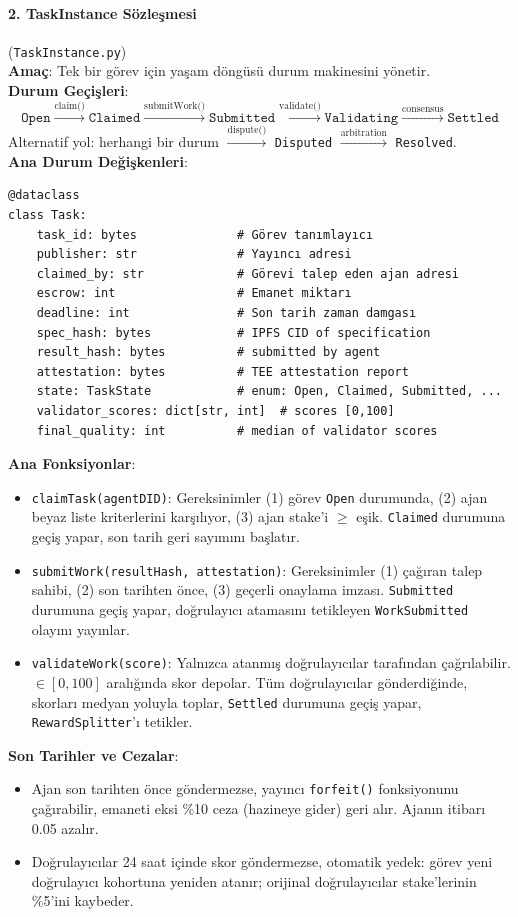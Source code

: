 \documentclass[11pt]{article}
\begin{document}
\paragraph{2. TaskInstance Sözleşmesi} (\texttt{TaskInstance.py})\\
\textbf{Amaç}: Tek bir görev için yaşam döngüsü durum makinesini yönetir.\\
\textbf{Durum Geçişleri}:
\begin{equation}
\texttt{Open} \xrightarrow{\text{claim()}} \texttt{Claimed} \xrightarrow{\text{submitWork()}} \texttt{Submitted} \xrightarrow{\text{validate()}} \texttt{Validating} \xrightarrow{\text{consensus}} \texttt{Settled}
\end{equation}
Alternatif yol: herhangi bir durum $\xrightarrow{\text{dispute()}}$ \texttt{Disputed} $\xrightarrow{\text{arbitration}}$ \texttt{Resolved}.\\
\textbf{Ana Durum Değişkenleri}:
\begin{verbatim}
@dataclass
class Task:
    task_id: bytes              # Görev tanımlayıcı
    publisher: str              # Yayıncı adresi
    claimed_by: str             # Görevi talep eden ajan adresi
    escrow: int                 # Emanet miktarı
    deadline: int               # Son tarih zaman damgası
    spec_hash: bytes            # IPFS CID of specification
    result_hash: bytes          # submitted by agent
    attestation: bytes          # TEE attestation report
    state: TaskState            # enum: Open, Claimed, Submitted, ...
    validator_scores: dict[str, int]  # scores [0,100]
    final_quality: int          # median of validator scores
\end{verbatim}
\textbf{Ana Fonksiyonlar}:
\begin{itemize}[noitemsep]
  \item \texttt{claimTask(agentDID)}: Gereksinimler (1) görev \texttt{Open} durumunda, (2) ajan beyaz liste kriterlerini karşılıyor, (3) ajan stake'i $\geq$ eşik. \texttt{Claimed} durumuna geçiş yapar, son tarih geri sayımını başlatır.
  \item \texttt{submitWork(resultHash, attestation)}: Gereksinimler (1) çağıran talep sahibi, (2) son tarihten önce, (3) geçerli onaylama imzası. \texttt{Submitted} durumuna geçiş yapar, doğrulayıcı atamasını tetikleyen \texttt{WorkSubmitted} olayını yayınlar.
  \item \texttt{validateWork(score)}: Yalnızca atanmış doğrulayıcılar tarafından çağrılabilir. $\in [0,100]$ aralığında skor depolar. Tüm doğrulayıcılar gönderdiğinde, skorları medyan yoluyla toplar, \texttt{Settled} durumuna geçiş yapar, \texttt{RewardSplitter}'ı tetikler.
\end{itemize}
\textbf{Son Tarihler ve Cezalar}:
\begin{itemize}[noitemsep]
  \item Ajan son tarihten önce göndermezse, yayıncı \texttt{forfeit()} fonksiyonunu çağırabilir, emaneti eksi \%10 ceza (hazineye gider) geri alır. Ajanın itibarı 0.05 azalır.
  \item Doğrulayıcılar 24 saat içinde skor göndermezse, otomatik yedek: görev yeni doğrulayıcı kohortuna yeniden atanır; orijinal doğrulayıcılar stake'lerinin \%5'ini kaybeder.
\end{itemize}
\end{document}
